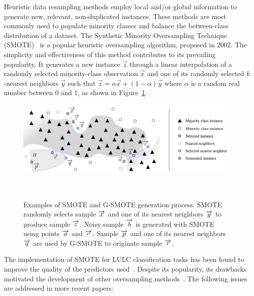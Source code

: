 \documentclass[parskip=full]{scrartcl}
\begin{document}
Heuristic data resampling methods employ local and/or global information to
generate new, relevant, non-duplicated instances. These methods are most
commonly used to populate minority classes and balance the between-class
distribution of a dataset. The Synthetic Minority Oversampling Technique
(SMOTE)~\cite{Chawla2002} is a popular heuristic oversampling
algorithm, proposed in 2002. The simplicity and effectiveness of this method
contributes to its prevailing popularity. It generates a new instance
$\overrightarrow{z}$ through a linear interpolation of a randomly selected
minority-class observation $\overrightarrow{x}$ and one of its randomly
selected $k$-nearest neighbors $\overrightarrow{y}$ such that
$\overrightarrow{z} = \alpha\overrightarrow{x} + (1-\alpha)\overrightarrow{y}$
where $\alpha$ is a random real number between 0 and 1, as shown in
Figure~\ref{fig:data_generation}. 

\begin{figure}[H]
	\centering
	\includegraphics[width=\linewidth]{../analysis/data_generation}
    \caption{Examples of SMOTE and G-SMOTE generation process. SMOTE randomly
        selects sample $\protect\overrightarrow{x}$ and one of its nearest
        neighbors $\protect\overrightarrow{y}$ to produce sample
        $\protect\overrightarrow{z}$. Noisy sample
        $\protect\overrightarrow{b}$ is generated with SMOTE using points
        $\protect\overrightarrow{a}$ and $\protect\overrightarrow{c}$.  Sample
        $\protect\overrightarrow{p}$ and one of its nearest neighbors
        $\protect\overrightarrow{q}$ are used by G-SMOTE to originate sample
        $\protect\overrightarrow{r}$.
    }~\label{fig:data_generation}
\end{figure}

The implementation of SMOTE for LULC classification tasks has been found to
improve the quality of the predictors used~\cite{Jozdani2019,Bogner2018}.
Despite its popularity, its drawbacks motivated the development of other
oversampling methods~\cite{Douzas2019}. The following issues are addressed in
more recent papers:
\end{document}
